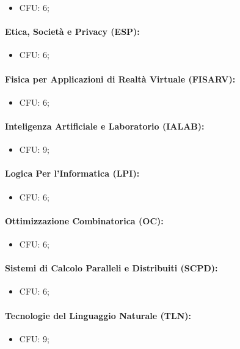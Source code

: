\begin{itemize}
  \item CFU: 6;
\end{itemize}

\paragraph{Etica, Società e Privacy (ESP):}

\begin{itemize}
  \item CFU: 6;
\end{itemize}

\paragraph{Fisica per Applicazioni di Realtà Virtuale (FISARV):}

\begin{itemize}
  \item CFU: 6;
\end{itemize}

\paragraph{Inteligenza Artificiale e Laboratorio (IALAB):}

\begin{itemize}
  \item CFU: 9;
\end{itemize}

\paragraph{Logica Per l'Informatica (LPI):}

\begin{itemize}
  \item CFU: 6;
\end{itemize}

\paragraph{Ottimizzazione Combinatorica (OC):}

\begin{itemize}
  \item CFU: 6;
\end{itemize}

\paragraph{Sistemi di Calcolo Paralleli e Distribuiti (SCPD):}

\begin{itemize}
  \item CFU: 6;
\end{itemize}

\paragraph{Tecnologie del Linguaggio Naturale (TLN):}

\begin{itemize}
  \item CFU: 9;
\end{itemize}
